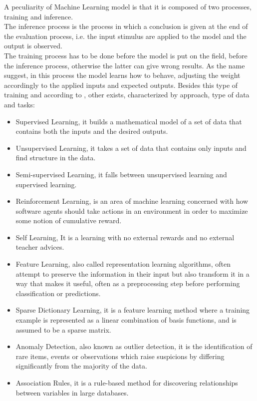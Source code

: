 A peculiarity of Machine Learning model is that it is composed of two processes, training and inference.\\
The inference process is the process in which a conclusion is given at the end of the evaluation process, i.e. the input stimulus are applied to the model and the output is observed.\\
The training process has to be done before the model is put on the field, before the inference process, otherwise the latter can give wrong results. As the name suggest, in this process the model learns how to behave, adjusting the weight accordingly to the applied inputs and expected outputs. Besides this type of training and according to \cite{book:1}, other exists, characterized by approach, type of data and tasks:
\begin{itemize}
\item Supervised Learning, it builds a mathematical model of a set of data that contains both the inputs and the desired outputs.
\item Unsupervised Learning, it takes a set of data that contains only inputs and find structure in the data.
\item Semi-supervised Learning, it falls between unsupervised learning and supervised learning.
\item Reinforcement Learning, is an area of machine learning concerned with how software agents should take actions in an environment in order to maximize some notion of cumulative reward.
\item Self Learning, It is a learning with no external rewards and no external teacher advices.
\item Feature Learning, also called representation learning algorithms, often attempt to preserve the information in their input but also transform it in a way that makes it useful, often as a preprocessing step before performing classification or predictions.
\item Sparse Dictionary Learning, it is a feature learning method where a training example is represented as a linear combination of basis functions, and is assumed to be a sparse matrix.
\item Anomaly Detection, also known as outlier detection, it is the identification of rare items, events or observations which raise suspicions by differing significantly from the majority of the data.
\item Association Rules, it is a rule-based method for discovering relationships between variables in large databases.
\end{itemize}

